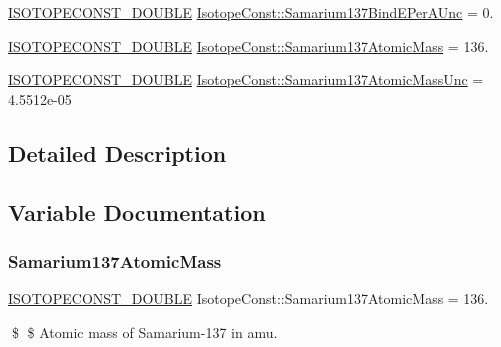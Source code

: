 \begin{DoxyCompactItemize}
\mbox{\hyperlink{group___isotope_const-_macros_ga8f45a7272ce02c0b4c65c44636ed719a}{I\+S\+O\+T\+O\+P\+E\+C\+O\+N\+S\+T\+\_\+\+D\+O\+U\+B\+LE}} \mbox{\hyperlink{group___isotope_const-_samarium-_sm137_ga948d1e61a64982fec780c905cffa6293}{Isotope\+Const\+::\+Samarium137\+Bind\+E\+Per\+A\+Unc}} = 0.
\item 
\mbox{\hyperlink{group___isotope_const-_macros_ga8f45a7272ce02c0b4c65c44636ed719a}{I\+S\+O\+T\+O\+P\+E\+C\+O\+N\+S\+T\+\_\+\+D\+O\+U\+B\+LE}} \mbox{\hyperlink{group___isotope_const-_samarium-_sm137_gaf29ce6ad55d409abb2173bec339763a1}{Isotope\+Const\+::\+Samarium137\+Atomic\+Mass}} = 136.
\item 
\mbox{\hyperlink{group___isotope_const-_macros_ga8f45a7272ce02c0b4c65c44636ed719a}{I\+S\+O\+T\+O\+P\+E\+C\+O\+N\+S\+T\+\_\+\+D\+O\+U\+B\+LE}} \mbox{\hyperlink{group___isotope_const-_samarium-_sm137_gab10ab6af98efcdf3db3960f0e9b05d37}{Isotope\+Const\+::\+Samarium137\+Atomic\+Mass\+Unc}} = 4.\+5512e-\/05
\end{DoxyCompactItemize}


\subsection{Detailed Description}


\subsection{Variable Documentation}
\mbox{\label{group___isotope_const-_samarium-_sm137_gaf29ce6ad55d409abb2173bec339763a1}} 
\subsubsection{\texorpdfstring{Samarium137\+Atomic\+Mass}{Samarium137AtomicMass}}
{\footnotesize\ttfamily \mbox{\hyperlink{group___isotope_const-_macros_ga8f45a7272ce02c0b4c65c44636ed719a}{I\+S\+O\+T\+O\+P\+E\+C\+O\+N\+S\+T\+\_\+\+D\+O\+U\+B\+LE}} Isotope\+Const\+::\+Samarium137\+Atomic\+Mass = 136.}

\$ \$ Atomic mass of Samarium-\/137 in amu. \mbox{\label{group___isotope_const-_samarium-_sm137_gab10ab6af98efcdf3db3960f0e9b05d37}} 

